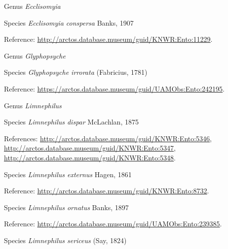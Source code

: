 \documentclass[9pt, article]{memoir}
\begin{document}
\begin{multicols}{2}
\vspace{6pt}\noindent\hspace{30pt}Genus \textit{Ecclisomyia}


\vspace{6pt}\noindent\hspace{36pt}Species \textit{Ecclisomyia conspersa} Banks, 1907


\vspace{6pt}Reference: 
\url{http://arctos.database.museum/guid/KNWR:Ento:11229}.

\vspace{6pt}\noindent\hspace{30pt}Genus \textit{Glyphopsyche}


\vspace{6pt}\noindent\hspace{36pt}Species \textit{Glyphopsyche irrorata} (Fabricius, 1781)


\vspace{6pt}Reference: 
\url{https://arctos.database.museum/guid/UAMObs:Ento:242195}.

\vspace{6pt}\noindent\hspace{30pt}Genus \textit{Limnephilus}


\vspace{6pt}\noindent\hspace{36pt}Species \textit{Limnephilus dispar} McLachlan, 1875


\vspace{6pt}References: 
\url{http://arctos.database.museum/guid/KNWR:Ento:5346}, 
\url{http://arctos.database.museum/guid/KNWR:Ento:5347}, 
\url{http://arctos.database.museum/guid/KNWR:Ento:5348}.

\vspace{6pt}\noindent\hspace{36pt}Species \textit{Limnephilus externus} Hagen, 1861


\vspace{6pt}Reference: 
\url{http://arctos.database.museum/guid/KNWR:Ento:8732}.

\vspace{6pt}\noindent\hspace{36pt}Species \textit{Limnephilus ornatus} Banks, 1897


\vspace{6pt}Reference: 
\url{http://arctos.database.museum/guid/UAMObs:Ento:239385}.

\vspace{6pt}\noindent\hspace{36pt}Species \textit{Limnephilus sericeus} (Say, 1824)



\end{multicols}
\end{document}
